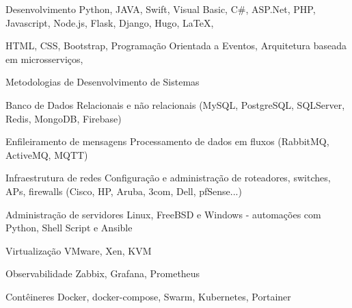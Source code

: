 

\begin{cvskills}

  \cvskill
    {Desenvolvimento} %
    {Python, JAVA, Swift, Visual Basic, C\#, ASP.Net, PHP, Javascript, Node.js, Flask, Django, Hugo, LaTeX,} %

\cvskill
{} %
{HTML, CSS, Bootstrap, Programação Orientada a Eventos, Arquitetura baseada em microsserviços, } %

\cvskill
{} %
{Metodologias de Desenvolvimento de Sistemas} %




\cvskill
    {Banco de Dados} %
    {Relacionais e não relacionais (MySQL, PostgreSQL, SQLServer, Redis, MongoDB, Firebase)} %


\cvskill
    {Enfileiramento de mensagens} %
    {Processamento de dados em fluxos (RabbitMQ, ActiveMQ, MQTT)} %

\cvskill
    {Infraestrutura de redes} %
    {Configuração e administração de roteadores, switches, APs, firewalls (Cisco, HP, Aruba, 3com, Dell, pfSense...)} %

\cvskill
    {Administração de servidores} %
    {Linux, FreeBSD e Windows - automações com Python, Shell Script e Ansible} %

\cvskill
    {Virtualização} %
    {VMware, Xen, KVM} %

\cvskill
    {Observabilidade} %
    {Zabbix, Grafana, Prometheus} %


\cvskill
    {Contêineres} %
    {Docker, docker-compose, Swarm, Kubernetes, Portainer} %


\end{cvskills}
